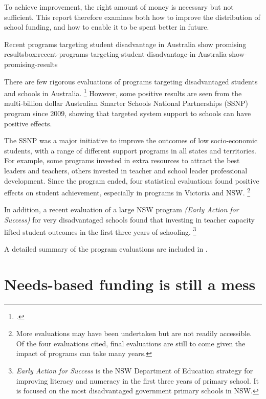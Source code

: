 \documentclass{grattan}
\begin{document}
To achieve improvement, the right amount of money is necessary but not sufficient.
This report therefore examines both how to improve the distribution of school funding, and how to enable it to be spent better in future.

\begin{smallbox}{Recent programs targeting student disadvantage in Australia show promising results}{box:recent-programs-targeting-student-disadvantage-in-Australia-show-promising-results}

There are few rigorous evaluations of programs targeting disadvantaged students and schools in Australia.%
\footcite{Commission2012SchoolWorkforce} However, some positive results are seen from the multi-billion dollar Australian Smarter Schools National Partnerships (SSNP) program since 2009, showing that targeted system support to schools can have positive effects.

The SSNP was a major initiative to improve the outcomes of low socio-economic students, with a range of different support programs in all states and territories.
For example, some programs invested in extra resources to attract the best leaders and teachers, others invested in teacher and school leader professional development.
Since the program ended, four statistical evaluations found positive effects on student achievement, especially in programs in Victoria and NSW.%
\footnote{More evaluations may have been undertaken but are not readily accessible.
Of the four evaluations cited, final evaluations are still to come given the impact of programs can take many years.}

In addition, a recent evaluation of a large NSW program \emph{(Early Action for Success)} for very disadvantaged schools found that investing in teacher capacity lifted student outcomes in the first three years of schooling.%
\footnote{\emph{Early Action for Success} is the NSW Department of Education strategy for improving literacy and numeracy in the first three years of primary school.
It is focused on the most disadvantaged government primary schools in NSW.}

A detailed summary of the program evaluations are included in .
\end{smallbox}

\chapter{Needs-based funding is still a mess}\label{chap:needs-based-funding-is-still-a-mess}
\end{document}
